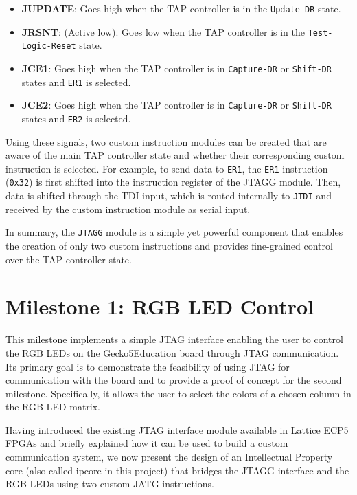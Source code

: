 \documentclass[a4paper,11pt,oneside]{report}
\newcommand{\boardName}{Gecko5Education \xspace}
\begin{document}
\begin{itemize}
\begin{itemize}
        \item \textbf{JUPDATE}: Goes high when the TAP controller is in the \texttt{Update-DR} state.
        
        \item \textbf{JRSNT}: (Active low). Goes low when the TAP controller is in the 
        \texttt{Test-Logic-Reset} state.
        
        \item \textbf{JCE1}: Goes high when the TAP controller is in \texttt{Capture-DR} or 
        \texttt{Shift-DR} states and \texttt{ER1} is selected.

        \item \textbf{JCE2}: Goes high when the TAP controller is in \texttt{Capture-DR} or 
        \texttt{Shift-DR} states and \texttt{ER2} is selected.
    \end{itemize}
\end{itemize}

Using these signals, two custom instruction modules can be created that are aware of the main TAP controller state
and whether their corresponding custom instruction is selected.
For example, to send data to \texttt{ER1}, the \texttt{ER1} instruction (\texttt{0x32}) is first shifted into the instruction register of the JTAGG module.
Then, data is shifted through the TDI input, which is routed internally to \texttt{JTDI} and received by the custom instruction module as serial input.

In summary, the \texttt{JTAGG} module is a simple yet powerful component that enables the creation of only two custom instructions
and provides fine-grained control over the TAP controller state.

\section{Milestone 1: RGB LED Control}

This milestone implements a simple JTAG interface enabling the user to control the RGB LEDs on the \boardName board through JTAG communication.  
Its primary goal is to demonstrate the feasibility of using JTAG for communication with the board and to provide a proof of concept for the second milestone.  
Specifically, it allows the user to select the colors of a chosen column in the RGB LED matrix.  

Having introduced the existing JTAG interface module available in Lattice ECP5 FPGAs and briefly explained how it can be used to build a custom communication system,  
we now present the design of an Intellectual Property core (also called ipcore in this project) that bridges the JTAGG interface and the RGB LEDs using two custom JATG instructions.
\end{document}
